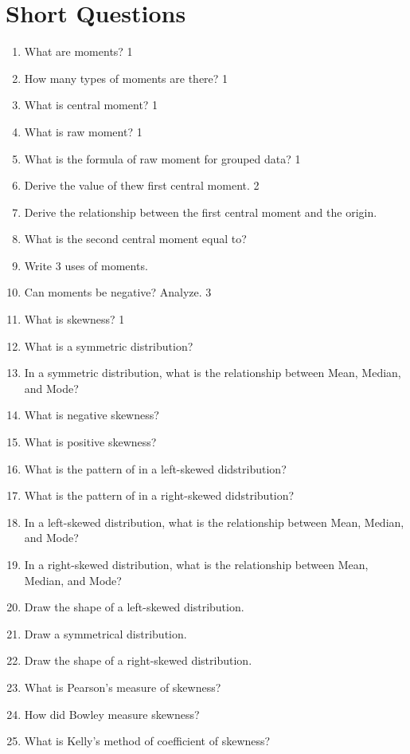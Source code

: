 \documentclass[a4paper,oneside]{book}
\begin{document}
\section{Short Questions}
\begin{enumerate}
    \item What are moments? \hfill 1
    \item How many types of moments are there?  \hfill 1
    \item What is central moment? \hfill 1
    \item  What is raw moment? \hfill 1
    \item  What is the formula of raw moment for grouped data? \hfill 1
    \item Derive the value of thew first central moment. \hfill 2
    \item  Derive the relationship between the first central moment and the origin.
    \item What is the second central moment equal to?
    \item Write 3 uses of moments.
    \item Can moments be negative? Analyze. \hfill 3
    \item What is skewness? \hfill 1
    \item What is a symmetric distribution?
    \item In a symmetric distribution, what is the relationship between Mean, Median, and Mode?
    \item What is negative skewness?
    \item What is positive skewness?
    \item What is the pattern of in a left-skewed didstribution?
    \item What is the pattern of in a right-skewed didstribution?
    \item In a left-skewed distribution, what is the relationship between Mean, Median, and Mode?
    \item In a right-skewed distribution, what is the relationship between Mean, Median, and Mode?
    \item Draw the shape of a left-skewed distribution.
    \item Draw a symmetrical distribution.  
    \item Draw the shape of a right-skewed distribution.
    \item What is Pearson's measure of skewness?
    \item How did Bowley measure skewness?
    \item What is Kelly's method of coefficient of skewness?

\end{enumerate}
\end{document}
